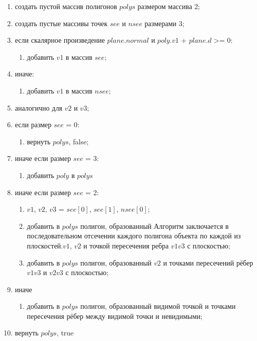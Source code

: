 \begin{enumerate}
	\item создать пустой массив полигонов $polys$ размером массива 2;
	\item создать пустые массивы точек $see$ и $nsee$ размерами 3;
	\item если скалярное произведение $plane.normal$ и $poly.v1$ + $plane.d$ >= 0:
	\begin{enumerate}
		\item добавить $v1$ в массив $see$;
	\end{enumerate}
	\item иначе:
	\begin{enumerate}
		\item добавить $v1$ в массив $nsee$;
	\end{enumerate}
	\item аналогично для $v2$ и $v3$;
	
	\item если размер $see$ = 0:
	\begin{enumerate}
		\item вернуть $polys$, false;
	\end{enumerate}
	\item иначе если размер $see$ = 3:
	\begin{enumerate}
		\item добавить $poly$ в $polys$
	\end{enumerate}
	\item иначе если размер $see$ = 2:
	\begin{enumerate}
		\item $v1$, $v2$, $v3$ = $see[0]$, $see[1]$, $nsee[0]$;
		\item добавить в $polys$ полигон, образованный Алгоритм заключается в последовательном отсечении каждого полигона объекта по каждой из плоскостей.$v1$, $v2$ и точкой пересечения ребра $v1v3$ с плоскостью;
		\item добавить в $polys$ полигон, образованный $v2$ и точками пересечений рёбер $v1v3$ и $v2v3$ с плоскостью;
	\end{enumerate}
	\item иначе
	\begin{enumerate}
		\item добавить в $polys$ полигон, образованный видимой точкой и точками пересечения рёбер между видимой точки и невидимыми;
	\end{enumerate}
	\item вернуть $polys$, true
\end{enumerate}


